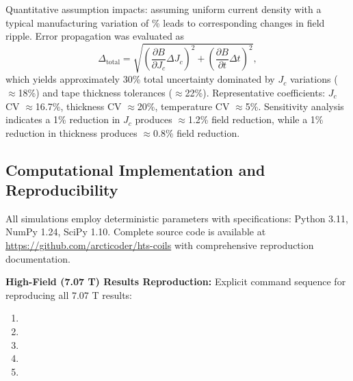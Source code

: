 \documentclass[10pt,twocolumn]{article}
\begin{document}
Quantitative assumption impacts: assuming uniform current density with a typical manufacturing variation of \% leads to corresponding changes in field ripple. Error propagation was evaluated as
\begin{equation}
\Delta_{\text{total}} = \sqrt{\left(\frac{\partial B}{\partial J_c}\Delta J_c\right)^2 + \left(\frac{\partial B}{\partial t}\Delta t\right)^2},
\end{equation}
which yields approximately 30\% total uncertainty dominated by $J_c$ variations ($\approx$18\%) and tape thickness tolerances ($\approx$22\%). Representative coefficients: $J_c$ CV $\approx$16.7\%, thickness CV $\approx$20\%, temperature CV $\approx$5\%. Sensitivity analysis indicates a 1\% reduction in $J_c$ produces $\approx$1.2\% field reduction, while a 1\% reduction in thickness produces $\approx$0.8\% field reduction.

\subsection{Computational Implementation and Reproducibility}

All simulations employ deterministic parameters with specifications: Python 3.11, NumPy 1.24, SciPy 1.10. Complete source code is available at \url{https://github.com/arcticoder/hts-coils} with comprehensive reproduction documentation.

			\textbf{High-Field (7.07 T) Results Reproduction:} Explicit command sequence for reproducing all 7.07 T results:
{\scriptsize\raggedright
\begin{enumerate}
\item \begin{minipage}[t]{\columnwidth}\ttfamily{}\end{minipage}
\item \begin{minipage}[t]{\columnwidth}\ttfamily{}\end{minipage}
\item \begin{minipage}[t]{\columnwidth}\ttfamily{}\end{minipage}
\item \begin{minipage}[t]{\columnwidth}\ttfamily{}\end{minipage}
\item \begin{minipage}[t]{\columnwidth}\ttfamily{}\end{minipage}
\end{enumerate}
}
\end{document}
